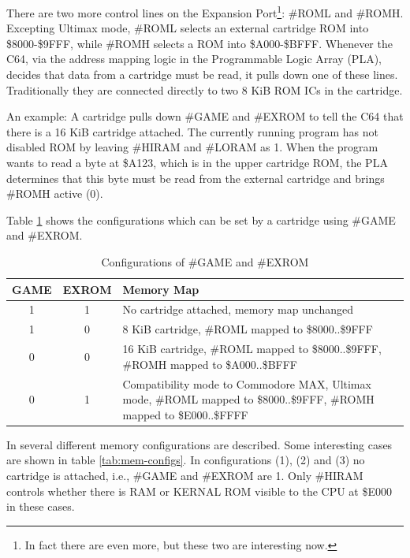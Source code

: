 \documentclass[a4paper,oneside]{memoir}
\begin{document}
There are two more control lines on the Expansion 
Port\footnote{In fact there are even more, but these two are interesting now.}:
\#ROML and \#ROMH. Excepting Ultimax mode, \#ROML selects an external
cartridge ROM into \$8000-\$9FFF, while \#ROMH selects a ROM into
\$A000-\$BFFF. Whenever the C64, via the address mapping logic in
the Programmable Logic Array (PLA), decides that data from a
cartridge must be read, it pulls down one of these lines.
Traditionally they are connected directly to two 8 KiB ROM ICs in
the cartridge.

An example: A cartridge pulls down \#GAME and \#EXROM to tell the C64
that there is a 16 KiB cartridge attached. The currently running
program has not disabled ROM by leaving \#HIRAM and \#LORAM as 1. When
the program wants to read a byte at \$A123, which is in the upper
cartridge ROM, the PLA determines that this byte must be read from
the external cartridge and brings \#ROMH active (0).

Table \ref {tab:game-exrom} shows the configurations which can be set by a cartridge using \#GAME and \#EXROM.

\begin{table}
    \centering
    \begin{tabularx}{\textwidth}{ccX}
        \toprule
        GAME & EXROM & Memory Map \\
        \midrule
        1 & 1 & No cartridge attached, memory map unchanged \\[3pt]
        1 & 0 & 8 KiB cartridge, \#ROML mapped to \$8000..\$9FFF \\[3pt]
        0 & 0 & 16 KiB cartridge, \#ROML mapped to \$8000..\$9FFF, \#ROMH mapped to \$A000..\$BFFF \\[3pt]
        0 & 1 & Compatibility mode to Commodore MAX, Ultimax mode,
                \#ROML mapped to \$8000..\$9FFF, \#ROMH mapped to \$E000..\$FFFF \\[3pt]
        \bottomrule
    \end{tabularx}
    \caption{Configurations of \#GAME and \#EXROM}
    \label{tab:game-exrom}
\end{table}

In \cite[Appendix~A]{PLA12} several different memory configurations are described.
Some interesting cases are shown in table \ref {tab:mem-configs}.
In configurations (1), (2) and (3) no cartridge is attached, i.e., \#GAME and \#EXROM are 1.
Only \#HIRAM controls whether there is RAM or KERNAL ROM visible to the CPU at \$E000 in these cases.
\end{document}
